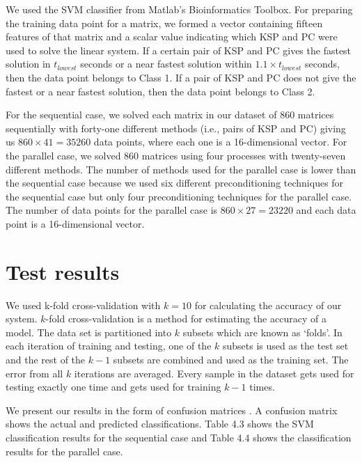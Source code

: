 We used the SVM classifier from Matlab's Bioinformatics Toolbox. For preparing the training data point for a matrix, we formed a vector containing fifteen features of that matrix and a scalar value indicating which KSP and PC were used to solve the linear system. If a certain pair of KSP and PC gives the fastest solution in $t_{lowest}$ seconds or a near fastest solution within $1.1 \times t_{lowest}$ seconds, then the data point belongs to Class 1. If a pair of KSP and PC does not give the fastest or a near fastest solution, then the data point belongs to Class 2. 

For the sequential case, we solved each matrix in our dataset of 860 matrices sequentially with forty-one different methods (i.e., pairs of KSP and PC) giving us $860 \times 41 = 35260$ data points, where each one is a 16-dimensional vector. For the parallel case, we solved 860 matrices using four processes with twenty-seven different methods. The number of methods used for the parallel case is lower than the sequential case because we used six different preconditioning techniques for the sequential case but only four preconditioning techniques for the parallel case. The number of data points for the parallel case is $860 \times 27 = 23220$ and each data point is a 16-dimensional vector.

\section{Test results}

We used k-fold cross-validation \cite{provost} with $k=10$ for calculating the accuracy of our system. $k$-fold cross-validation is a method for estimating the accuracy of a model. The data set is partitioned into $k$ subsets which are known as `folds'. In each iteration of training and testing, one of the $k$ subsets is used as the test set and the rest of the $k-1$ subsets are combined and used as the training set. The error from all $k$ iterations are averaged. Every sample in the dataset gets used for testing exactly one time and gets used for training $k-1$ times.

We present our results in the form of confusion matrices \cite{provost}. A confusion matrix shows the actual and predicted classifications. Table 4.3 shows the SVM classification results for the sequential case and Table 4.4 shows the classification results for the parallel case.


